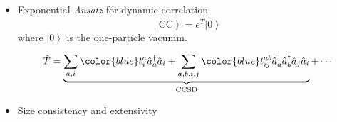 \begin{itemize}
\item
  Exponential \textit{Ansatz} for dynamic correlation
  \[
    \left | \mathrm{CC} \right \rangle  = e^{\hat{T}} \left | 0 \right \rangle
  \]
where $ \left | 0 \right \rangle  $ is the one-particle vacumm.
%
\[
  \hat{T} =
  \underbrace{
  \sum_{a,i}^{}
    {\color{blue}t^{a}_{i} }
    \hat{a}^{\dagger}_{a} \hat{a}_{i}
  +
  \sum_{a,b,i,j}
    {\color{blue}t^{ab}_{ij} }
    \hat{a}^{\dagger}_{a} \hat{a}^{\dagger}_{b}
    \hat{a}_{j}           \hat{a}_{i}
  }_{\mathrm{CCSD}}
  + \cdots
\]
%
\item
  Size consistency and extensivity
\end{itemize}

